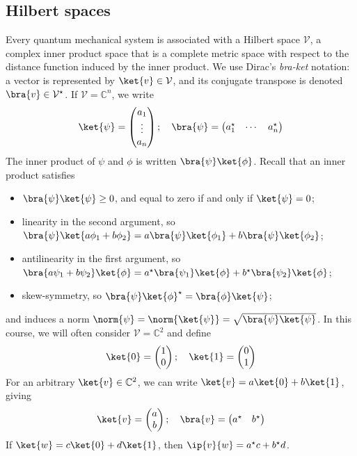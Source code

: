 \subsection{Hilbert spaces}
Every quantum mechanical system is associated with a Hilbert space \( \mathcal V \), a complex inner product space that is a complete metric space with respect to the distance function induced by the inner product.
We use Dirac's \emph{bra-ket} notation: a vector is represented by \( \ket{v} \in \mathcal V \), and its conjugate transpose is denoted \( \bra{v} \in \mathcal V^\star \).
If \( \mathcal V = \mathbb C^n \), we write
\[ \ket{\psi} = \begin{pmatrix}
    a_1 \\
    \vdots \\
    a_n
\end{pmatrix};\quad \bra{\psi} = \begin{pmatrix}
    a_1^\star & \cdots & a_n^\star
\end{pmatrix} \]
The inner product of \( \psi \) and \( \phi \) is written \( \bra{\psi}\ket{\phi} \).
Recall that an inner product satisfies
\begin{itemize}
    \item \( \bra{\psi}\ket{\psi} \geq 0 \), and equal to zero if and only if \( \ket{\psi} = 0 \);
    \item linearity in the second argument, so \( \bra{\psi}\ket{a\phi_1 + b\phi_2} = a \bra{\psi}\ket{\phi_1} + b \bra{\psi}\ket{\phi_2} \);
    \item antilinearity in the first argument, so \( \bra{a\psi_1 + b\psi_2}\ket{\phi} = a^\star \bra{\psi_1}\ket{\phi} + b^\star \bra{\psi_2}\ket{\phi} \);
    \item skew-symmetry, so \( \bra{\psi}\ket{\phi}^\star = \bra{\phi}\ket{\psi} \);
\end{itemize}
and induces a norm \( \norm{\psi} = \norm{\ket{\psi}} = \sqrt{\bra{\psi}\ket{\psi}} \).
In this course, we will often consider \( \mathcal V = \mathbb C^2 \) and define
\[ \ket{0} = \begin{pmatrix}
    1 \\ 0
\end{pmatrix};\quad \ket{1} = \begin{pmatrix}
    0 \\ 1
\end{pmatrix} \]
For an arbitrary \( \ket{v} \in \mathbb C^2 \), we can write \( \ket{v} = a \ket{0} + b \ket{1} \), giving
\[ \ket{v} = \begin{pmatrix}
    a \\ b
\end{pmatrix};\quad \bra{v} = \begin{pmatrix}
    a^\star & b^\star
\end{pmatrix} \]
If \( \ket{w} = c \ket{0} + d \ket{1} \), then \( \ip{v}{w} = a^\star c + b^\star d \).

